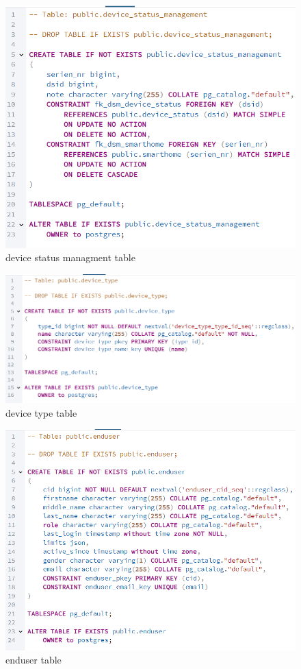 \documentclass{article}
\begin{document}
\begin{figure}[H]
\centering
\includegraphics[width=\linewidth]{img/device_status_managment.png}
\caption{device status managment table}
\end{figure}


\begin{figure}[H]
\centering
\includegraphics[width=\linewidth]{img/device_type.png}
\caption{device type table}
\end{figure}

\begin{figure}[H]
\centering
\includegraphics[width=\linewidth]{img/enduser.png}
\caption{enduser table}
\end{figure}
\end{document}
